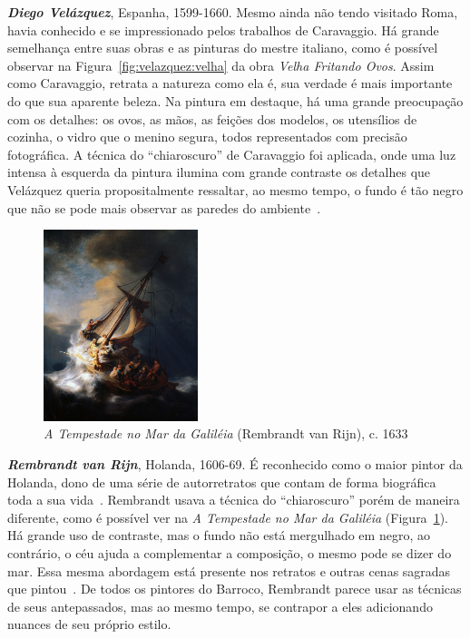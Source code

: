 \textbf{\emph{Diego Velázquez}}, Espanha, 1599-1660. Mesmo ainda não tendo
visitado Roma, havia conhecido e se impressionado pelos trabalhos de
Caravaggio. Há grande semelhança entre suas obras e as pinturas do mestre
italiano, como é possível observar na Figura~\ref{fig:velazquez:velha} da obra
\textit{Velha Fritando Ovos}. Assim como Caravaggio, retrata a natureza como ela
é, sua verdade é mais importante do que sua aparente beleza. Na pintura em
destaque, há uma grande preocupação com os detalhes: os ovos, as mãos, as
feições dos modelos, os utensílios de cozinha, o vidro que o menino segura,
todos representados com precisão fotográfica. A técnica do ``chiaroscuro'' de
Caravaggio foi aplicada, onde uma luz intensa à esquerda da pintura ilumina com
grande contraste os detalhes que Velázquez queria propositalmente ressaltar, ao
mesmo tempo, o fundo é tão negro que não se pode mais observar as paredes do
ambiente~\cite{gombrich}.

\begin{figure}
  \begin{center}
    \includegraphics[width=0.4\textwidth]{figs/rembrandt_tempestade.png}
  \end{center}
  \caption{\emph{A Tempestade no Mar da Galiléia} (Rembrandt van Rijn), c. 1633}
  \label{fig:rembrandt:tempestade}
\end{figure}

\textbf{\emph{Rembrandt van Rijn}}, Holanda, 1606-69. É reconhecido
como o maior pintor da Holanda, dono de uma série de autorretratos que
contam de forma biográfica toda a sua vida~\cite{van1999,
  gombrich}. Rembrandt usava a técnica do ``chiaroscuro'' porém de
maneira diferente, como é possível ver na \textit{A Tempestade no Mar
  da Galiléia} (Figura~\ref{fig:rembrandt:tempestade}).  Há grande uso
de contraste, mas o fundo não está mergulhado em negro, ao contrário,
o céu ajuda a complementar a composição, o mesmo pode se dizer do
mar. Essa mesma abordagem está presente nos retratos e outras cenas
sagradas que pintou~\cite{van1997}. De todos os pintores do Barroco,
Rembrandt parece usar as técnicas de seus antepassados, mas ao mesmo
tempo, se contrapor a eles adicionando nuances de seu próprio estilo.

